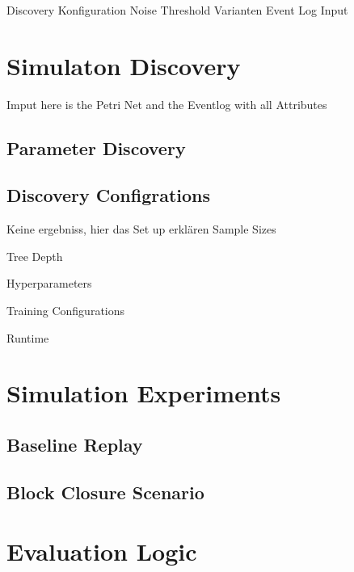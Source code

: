 Discovery Konfiguration
Noise Threshold
Varianten
Event Log Input


\section{ Simulaton Discovery}

Imput here is the Petri Net and the Eventlog with all Attributes

\subsection{Parameter Discovery}

\subsection{Discovery Configrations}
Keine ergebniss, hier das Set up erklären
Sample Sizes

Tree Depth

Hyperparameters

Training Configurations

Runtime

\section{Simulation Experiments}

\subsection{Baseline Replay}


\subsection{Block Closure Scenario}

\section{Evaluation Logic}

